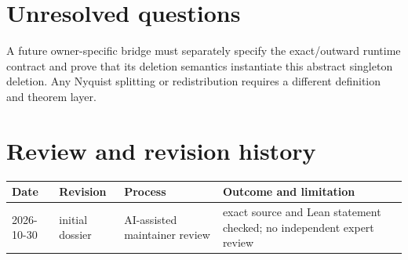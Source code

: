 \documentclass[11pt]{article}
\begin{document}
\section{Unresolved questions}
A future owner-specific bridge must separately specify the exact/outward runtime contract and prove
that its deletion semantics instantiate this abstract singleton deletion.  Any Nyquist splitting or
redistribution requires a different definition and theorem layer.

\section{Review and revision history}
\begin{tabularx}{\textwidth}{@{}lllX@{}}
\toprule
Date & Revision & Process & Outcome and limitation \\
\midrule
2026-10-30 & initial dossier & AI-assisted maintainer review & exact source and Lean statement checked; no independent expert review \\
\bottomrule
\end{tabularx}
\end{document}

